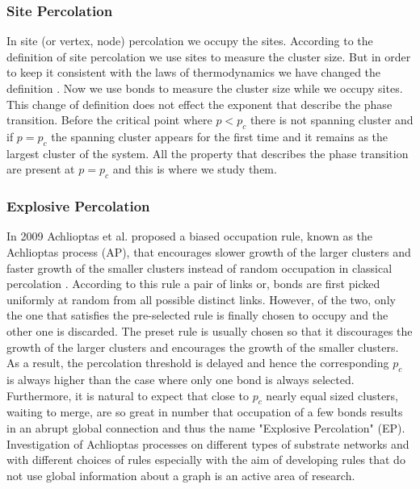 		\subsubsection{Site Percolation}
			In site (or vertex, node) percolation we occupy the sites. According to the definition of site percolation we use sites to measure the cluster size. But in order to keep it consistent with the laws of thermodynamics we have changed the definition \cite{redefinition-of-site-percolation}. Now we use bonds to measure the cluster size while we occupy sites. This change of definition does not effect the exponent that describe the phase transition. Before the critical point where $p<p_c$ there is not spanning cluster and if $p=p_c$ the spanning cluster appears for the first time and it remains as the largest cluster of the system. All the property that describes the phase transition are present at $p=p_c$ and this is where we study them.
		\subsubsection{Explosive Percolation}
		In 2009 Achlioptas et al. proposed a biased occupation rule, known as the Achlioptas process (AP), that encourages slower growth of the larger clusters and faster growth of the smaller clusters	instead of random occupation in classical percolation \cite{Achlioptas2009}. According to this rule a pair of links	or, bonds are first picked uniformly at random from all possible distinct links. However, of the		two, only the one that satisfies the pre-selected rule is finally chosen to occupy and the other one	is discarded. The preset rule is usually chosen so that it discourages the growth of the larger	clusters and encourages the growth of the smaller clusters. As a result, the percolation threshold is delayed and hence the corresponding $p_c$ is always higher than the case where only one bond is	always selected. Furthermore, it is natural to expect that close to $p_c$ nearly equal sized clusters, waiting to merge, are so great in number that occupation of a few bonds results in an abrupt global	connection and thus the name "Explosive Percolation" (EP). Investigation of Achlioptas processes on different types of substrate networks and with different choices of rules especially with the aim	of developing rules that do not use global information about a graph is an active area of research.
